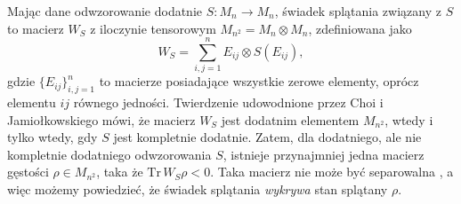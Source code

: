 Mając dane odwzorowanie dodatnie $S: M_{n} \rightarrow M_{n}$,
świadek splątania związany z $S$ to macierz $W_{S}$ z
iloczynie tensorowym $M_{n^{2}} = M_{n} \! \otimes \! M_{n}$,
zdefiniowana jako
\begin{equation}
\label{def:entanglement-witness}
    W_{S} = \sum \limits_{i,j =1}^{n} E_{ij} \otimes S(E_{ij}),
\end{equation}
gdzie $\{ E_{ij}\}_{i,j=1}^{n}$ to macierze posiadające wszystkie
zerowe elementy, oprócz elementu $ij$ równego jedności.
Twierdzenie udowodnione przez Choi i Jamiołkowskiego
\cite{choi1975completely,jamiolkowski1974effective}
mówi, że macierz $W_{S}$ jest dodatnim elementem $M_{n^{2}}$,
wtedy i tylko wtedy, gdy $S$ jest kompletnie dodatnie.
Zatem, dla dodatniego, ale nie kompletnie dodatniego odwzorowania $S$,
istnieje przynajmniej jedna macierz gęstości $\rho \in M_{n^{2}}$,
taka że $\text{Tr}\, W_{S} \rho < 0$.
Taka macierz nie może być separowalna \cite{werner1989quantum},
a więc możemy powiedzieć, że świadek splątania \emph{wykrywa}
stan splątany $\rho$.

